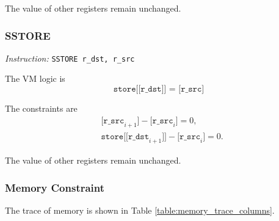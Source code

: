 The value of other registers remain unchanged.

\subsubsection{SSTORE}

\emph{Instruction:} \verb|SSTORE r_dst, r_src|

The VM logic is
\[ \texttt{store[[r\_dst]] = [r\_src]} \]

The constraints are
\begin{align*}
    & \texttt{[r\_src}_{i+1}\texttt{]} - \texttt{[r\_src}_i\texttt{]} = 0, \\
    & \texttt{store[[r\_dst}_{i+1}\texttt{]]} - \texttt{[r\_src}_i\texttt{]} = 0.
\end{align*}

The value of other registers remain unchanged.

\subsubsection{Memory Constraint}

The trace of memory is shown in Table \ref{table:memory_trace_columns}.
\begin{table}[!ht]
    \centering {}
    \caption{Memory trace table}
    \label{table:memory_trace_columns}
\end{table}

